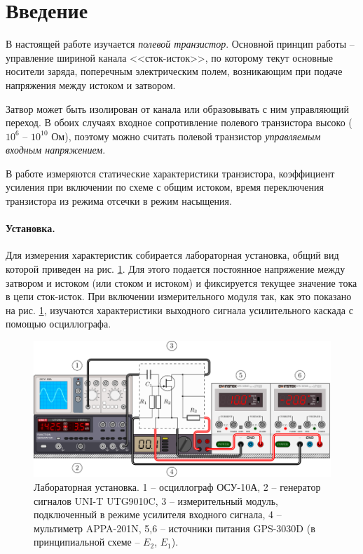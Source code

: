 \documentclass[a4paper,14pt]{extarticle}
\begin{document}


\tableofcontents
\newpage



\section*{Введение}
\vspace{-0.5em}
В настоящей работе изучается \textit{полевой транзистор}. Основной принцип работы -- управление шириной канала <<сток-исток>>, по которому текут основные носители заряда, поперечным электрическим полем, возникающим при подаче напряжения между истоком и затвором.

Затвор может быть изолирован от канала или образовывать с ним управляющий переход. В обоих случаях входное сопротивление полевого транзистора высоко ($10^6$ -- $10^{10}$ Ом), поэтому можно считать полевой транзистор \textit{управляемым входным напряжением}.

В работе измеряются статические характеристики транзистора, коэффициент усиления при включении по схеме с общим истоком, время переключения транзистора из режима отсечки в режим насыщения. 

\vspace{-0.5em}

\paragraph{Установка.} Для измерения характеристик собирается лабораторная установка, общий вид которой приведен на рис. \ref{fig:1}. Для этого подается постоянное напряжение между затвором и истоком (или стоком и истоком) и фиксируется текущее значение тока в цепи сток-исток. При включении измерительного модуля так, как это показано на рис. \ref{fig:1}, изучаются характеристики выходного сигнала усилительного каскада с помощью осциллографа.

\begin{figure}[H]
	\centering
	\includegraphics[width=\textwidth]{fig/view}
	\vspace{-1em}
	\caption{Лабораторная установка. 1 -- осциллограф ОСУ-10А, 2 -- генератор сигналов UNI-T UTG9010C, 3 -- измерительный модуль, подключенный в режиме усилителя входного сигнала, 4 -- мультиметр APPA-201N, 5,6 -- источники питания GPS-3030D (в принципиальной схеме -- $E_2$, $E_1$).}
	\label{fig:1}
\end{figure}
\end{document}
